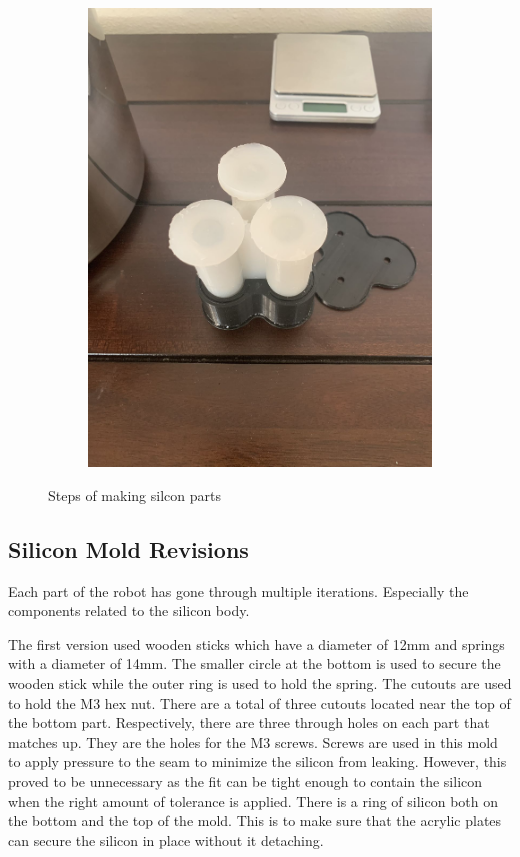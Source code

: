 \documentclass[twoside, 11pt]{article}
\begin{document}
\begin{figure}[H]
\begin{subfigure}[t]{0.165\linewidth}
		\includegraphics[width=\textwidth]{extract}
	\end{subfigure}%
	\caption{Steps of making silcon parts}
\end{figure}
\subsection{Silicon Mold Revisions}
Each part of the robot has gone through multiple iterations. Especially the components related to the silicon body. 

The first version used wooden sticks which have a diameter of 12mm and springs with a diameter of 14mm. The smaller circle at the bottom is used to secure the wooden stick while the outer ring is used to hold the spring. The cutouts are used to hold the M3 hex nut. There are a total of three cutouts located near the top of the bottom part. Respectively, there are three through holes on each part that matches up. They are the holes for the M3 screws. Screws are used in this mold to apply pressure to the seam to minimize the silicon from leaking. However, this proved to be unnecessary as the fit can be tight enough to contain the silicon when the right amount of tolerance is applied. There is a ring of silicon both on the bottom and the top of the mold. This is to make sure that the acrylic plates can secure the silicon in place without it detaching.
\end{document}
